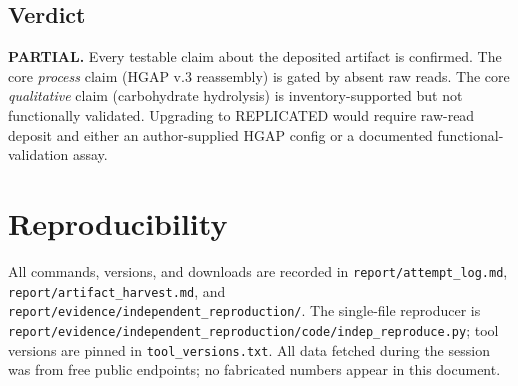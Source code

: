 \documentclass[11pt,letterpaper]{article}
\begin{document}
\subsection*{Verdict}
\textbf{PARTIAL.} Every testable claim about the deposited artifact is confirmed. The core \emph{process} claim (HGAP v.3 reassembly) is gated by absent raw reads. The core \emph{qualitative} claim (carbohydrate hydrolysis) is inventory-supported but not functionally validated. Upgrading to REPLICATED would require raw-read deposit and either an author-supplied HGAP config or a documented functional-validation assay.

\section{Reproducibility}

All commands, versions, and downloads are recorded in \texttt{report/attempt\_log.md}, \texttt{report/artifact\_harvest.md}, and \texttt{report/evidence/independent\_reproduction/}. The single-file reproducer is \texttt{report/evidence/independent\_reproduction/code/indep\_reproduce.py}; tool versions are pinned in \texttt{tool\_versions.txt}. All data fetched during the session was from free public endpoints; no fabricated numbers appear in this document.
\end{document}
